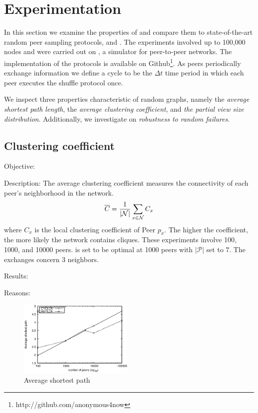 
\section{Experimentation}
\label{sec:experiments}
In this section we examine the properties of \SCAMPLON{} and 
compare them to state-of-the-art random peer sampling protocols, \SCAMP{} and \CYCLON{}. 
The experiments involved up to 100,000 nodes and were carried out on \PEERSIM{} \cite{peersim}, 
a simulator for peer-to-peer networks.
The implementation of the protocols is available on Github\footnote{http://github.com/anonymous4now}.
As peers periodically exchange information we define a cycle to be 
the $\Delta t$ time period in which each peer executes the shuffle protocol once.

We inspect three properties characteristic of random graphs, namely the
\emph{average shortest path length}, the \emph{average clustering coefficient},
and \emph{the partial view size distribution}. Additionally, we investigate on
\emph{robustness to random failures}.

\subsection{Clustering coefficient}
\begin{asparadesc}
\item[Objective:]
\item[Description:] The average clustering coefficient measures the
  connectivity of each peer's neighborhood in the network.
  \begin{equation}
    \overline{C} = {1\over |\mathcal{N}|}\sum\limits_{x\in\mathcal{N}}C_x
    \end{equation}
    where $C_x$ is the local clustering coefficient of Peer $p_x$. The higher
    the coefficient, the more likely the network contains cliques. These
    experiments involve 100, 1000, and 10000 peers. \CYCLON{} is set to be optimal
    at 1000 peers with $|\mathcal{P}|$ set to $7$. The exchanges concern $3$
    neighbors.
\item[Results:]
\item[Reasons:]
\end{asparadesc}

\begin{figure}
    \centering
    \includegraphics[width=0.49\textwidth]{img/avgpath.eps}
    \caption{Average shortest path}
    \label{fig:avgpath}
\end{figure}


